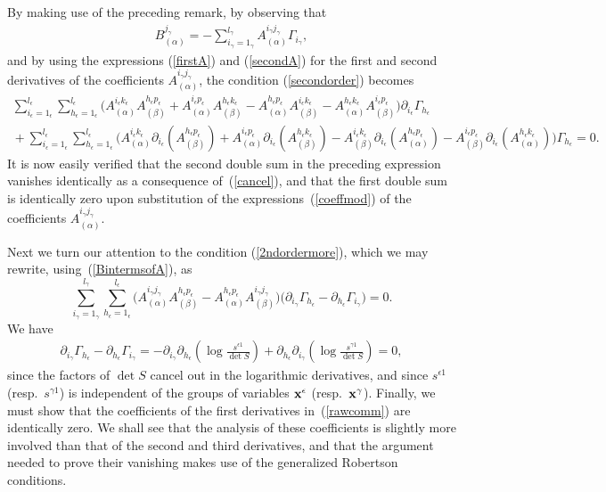 \documentclass[pdftex]{sigma}
\numberwithin{equation}{section}
\newcommand{\igamma}{i_{\gamma}}
\newcommand{\jgamma}{j_{\gamma}}
\newcommand{\lgamma}{l_{\gamma}}
\newcommand{\kepsilon}{k_{\epsilon}}
\newcommand{\pepsilon}{p_{\epsilon}}
\newcommand{\lepsilon}{l_{\epsilon}}
\newcommand{\iepsilon}{i_{\epsilon}}
\newcommand{\hepsilon}{h_{\epsilon}}
\begin{document}
By making use of the preceding remark, by observing that
\begin{gather}\label{BintermsofA}
B_{(\alpha)}^{\jgamma}= -\sum_{\igamma = 1_{\gamma}}^{\lgamma}A_{(\alpha)}^{\igamma \jgamma}\Gamma_{\igamma},
\end{gather}
and by using the expressions (\ref{firstA}) and (\ref{secondA}) for the first and second derivatives of the coefficients $A_{(\alpha)}^{\igamma \jgamma}$, the condition (\ref{secondorder}) becomes
\begin{gather*}
\sum_{\iepsilon = 1_{\epsilon}}^{\lepsilon}\sum_{\hepsilon = 1_{\epsilon}}^{\lepsilon}\big(A_{(\alpha)}^{\iepsilon \kepsilon}A_{(\beta)}^{\hepsilon \pepsilon}+A_{(\alpha)}^{\iepsilon \pepsilon}A_{(\beta)}^{\hepsilon \kepsilon}-A_{(\alpha)}^{\hepsilon \pepsilon}A_{(\beta)}^{\iepsilon \kepsilon}-A_{(\alpha)}^{\hepsilon \kepsilon}A_{(\beta)}^{\iepsilon \pepsilon}\big)\partial_{\iepsilon}\Gamma_{\hepsilon}\\
{} +\!\sum_{\iepsilon = 1_{\epsilon}}^{\lepsilon}\sum_{\hepsilon = 1_{\epsilon}}^{\lepsilon}\!\big(A_{(\alpha)}^{\iepsilon \kepsilon}\partial_{\iepsilon}(A_{(\beta)}^{\hepsilon \pepsilon})+A_{(\alpha)}^{\iepsilon \pepsilon}\partial_{\iepsilon}(A_{(\beta)}^{\hepsilon \kepsilon})-A_{(\beta)}^{\iepsilon \kepsilon}\partial_{\iepsilon}(A_{(\alpha)}^{\hepsilon \pepsilon})-A_{(\beta)}^{\iepsilon \pepsilon}\partial_{\iepsilon}(A_{(\alpha)}^{\hepsilon \kepsilon})\big)\Gamma_{\hepsilon}=0.
\end{gather*}
It is now easily verified that the second double sum in the preceding expression vanishes identically as a consequence of~(\ref{cancel}), and that the first double sum is identically zero upon substitution of the expressions~(\ref{coeffmod}) of the coefficients $A_{(\alpha)}^{\igamma \jgamma}$.

Next we turn our attention to the condition (\ref{2ndordermore}), which we may rewrite, using~(\ref{BintermsofA}), as
\[
\sum_{\igamma=1_{\gamma}}^{\lgamma}\sum_{\hepsilon = 1_{\epsilon}}^{\lepsilon}\big(A_{(\alpha)}^{\igamma \jgamma}A_{(\beta)}^{\hepsilon \pepsilon}-A_{(\alpha)}^{\hepsilon \pepsilon}A_{(\beta)}^{\igamma \jgamma}\big)\big(\partial_{\igamma}\Gamma_{\hepsilon}-\partial_{\hepsilon}\Gamma_{\igamma}\big)=0.
\]
We have
\begin{gather}\label{curlGamma}
\partial_{\igamma}\Gamma_{\hepsilon}-\partial_{\hepsilon}\Gamma_{\igamma}=-\partial_{\igamma}\partial_{\hepsilon}\left(\log \frac{s^{\epsilon 1}}{\det S}\right)+\partial_{\hepsilon}\partial_{\igamma}\left(\log \frac{s^{\gamma 1}}{\det S}\right)=0,
\end{gather}
since the factors of $\det S$ cancel out in the logarithmic derivatives, and since $s^{\epsilon 1}$ (resp.~$s^{\gamma 1}$) is independent of the groups of variables ${\bf x}^{\epsilon}$ (resp.~${\bf x}^{\gamma}$).
Finally, we must show that the coefficients of the first derivatives in~(\ref{rawcomm}) are identically zero. We shall see that the analysis of these coefficients is slightly more involved than that of the second and third derivatives, and that the argument needed to prove their vanishing makes use of the generalized Robertson conditions.
\end{document}

